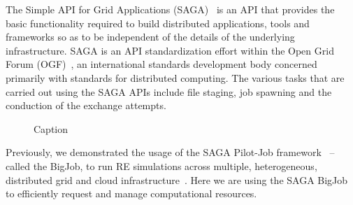 \documentclass[a4paper,10pt]{article}
\begin{document}
The Simple API for Grid Applications (SAGA)~\cite{saga_gfd90} is an API that provides the basic functionality required to build distributed applications, tools and frameworks so as to be independent of the details of the underlying infrastructure. SAGA is an API standardization effort within the Open Grid Forum (OGF)~\cite{ogf_web}, an international standards development body concerned primarily with standards for distributed computing. The various tasks that are carried out using the SAGA APIs include file staging, job spawning and the conduction of the exchange attempts.


 \begin{figure}
\centering
 
\label{fig:sync}
\caption{\small Caption}
\end{figure}


Previously, we demonstrated the usage of the SAGA Pilot-Job framework~\cite{saga_bigjob_condor_cloud} -- called the BigJob, to run RE simulations across multiple, heterogeneous, distributed grid and cloud infrastructure~\cite{Luckow:2008fp}. Here we are using the SAGA BigJob to efficiently request and manage computational resources. 
\end{document}
